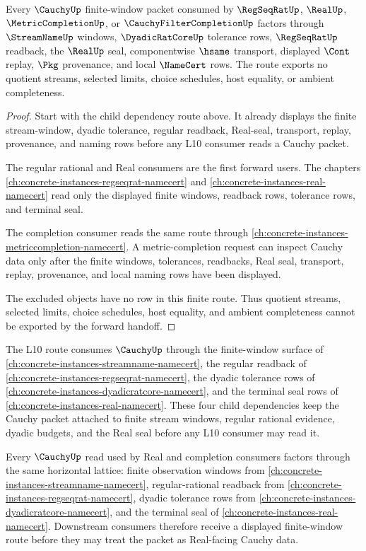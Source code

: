\begin{theorem}
\label{thm:cauchy-regseqrat-completion-forward-route}
Every $\CauchyUp$ finite-window packet consumed by $\RegSeqRatUp$, $\RealUp$, $\MetricCompletionUp$, or $\CauchyFilterCompletionUp$ factors through $\StreamNameUp$ windows, $\DyadicRatCoreUp$ tolerance rows, $\RegSeqRatUp$ readback, the $\RealUp$ seal, componentwise $\hsame$ transport, displayed $\Cont$ replay, $\Pkg$ provenance, and local $\NameCert$ rows. The route exports no quotient streams, selected limits, choice schedules, host equality, or ambient completeness.
\end{theorem}
\begin{proof}
Start with the child dependency route above. It already displays the finite stream-window, dyadic tolerance, regular readback, Real-seal, transport, replay, provenance, and naming rows before any L10 consumer reads a Cauchy packet.

The regular rational and Real consumers are the first forward users. The chapters \autoref{ch:concrete-instances-regseqrat-namecert} and \autoref{ch:concrete-instances-real-namecert} read only the displayed finite windows, readback rows, tolerance rows, and terminal seal.

The completion consumer reads the same route through \autoref{ch:concrete-instances-metriccompletion-namecert}. A metric-completion request can inspect Cauchy data only after the finite windows, tolerances, readbacks, Real seal, transport, replay, provenance, and local naming rows have been displayed.

The excluded objects have no row in this finite route. Thus quotient streams, selected limits, choice schedules, host equality, and ambient completeness cannot be exported by the forward handoff.
\end{proof}

The L10 route consumes $\CauchyUp$ through the finite-window surface of
\autoref{ch:concrete-instances-streamname-namecert}, the regular readback of
\autoref{ch:concrete-instances-regseqrat-namecert}, the dyadic tolerance rows
of \autoref{ch:concrete-instances-dyadicratcore-namecert}, and the terminal
seal rows of \autoref{ch:concrete-instances-real-namecert}. These four child
dependencies keep the Cauchy packet attached to finite stream windows,
regular rational evidence, dyadic budgets, and the Real seal before any L10
consumer may read it.

Every $\CauchyUp$ read used by Real and completion consumers factors through the same horizontal lattice: finite observation windows from \autoref{ch:concrete-instances-streamname-namecert}, regular-rational readback from \autoref{ch:concrete-instances-regseqrat-namecert}, dyadic tolerance rows from \autoref{ch:concrete-instances-dyadicratcore-namecert}, and the terminal seal of \autoref{ch:concrete-instances-real-namecert}. Downstream consumers therefore receive a displayed finite-window route before they may treat the packet as Real-facing Cauchy data.
